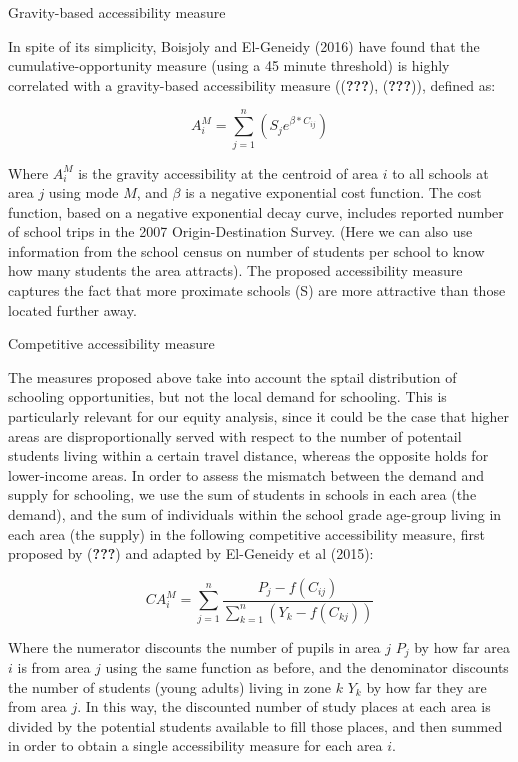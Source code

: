 \documentclass[]{article}
\begin{document}
Gravity-based accessibility measure

In spite of its simplicity, Boisjoly and El-Geneidy (2016) have found
that the cumulative-opportunity measure (using a 45 minute threshold) is
highly correlated with a gravity-based accessibility measure
(({\textbf{???}}), ({\textbf{???}})), defined as:

\[ A_{i}^M= \sum_{j=1}^n(S_{j}e^{\beta*C_{ij}}) \]

Where \(A_{i}^M\) is the gravity accessibility at the centroid of area
\(i\) to all schools at area \(j\) using mode \(M\), and \(\beta\) is a
negative exponential cost function. The cost function, based on a
negative exponential decay curve, includes reported number of school
trips in the 2007 Origin-Destination Survey. (Here we can also use
information from the school census on number of students per school to
know how many students the area attracts). The proposed accessibility
measure captures the fact that more proximate schools (S) are more
attractive than those located further away.

Competitive accessibility measure

The measures proposed above take into account the sptail distribution of
schooling opportunities, but not the local demand for schooling. This is
particularly relevant for our equity analysis, since it could be the
case that higher areas are disproportionally served with respect to the
number of potentail students living within a certain travel distance,
whereas the opposite holds for lower-income areas. In order to assess
the mismatch between the demand and supply for schooling, we use the sum
of students in schools in each area (the demand), and the sum of
individuals within the school grade age-group living in each area (the
supply) in the following competitive accessibility measure, first
proposed by ({\textbf{???}}) and adapted by El-Geneidy et al (2015):

\[ CA_{i}^M= \sum_{j=1}^n\frac{P_{j}-f(C_{ij})}{\sum_{k=1}^n(Y_{k}-f(C_{kj}))}\]

Where the numerator discounts the number of pupils in area \(j\)
\(P_{j}\) by how far area \(i\) is from area \(j\) using the same
function as before, and the denominator discounts the number of students
(young adults) living in zone \(k\) \(Y_{k}\) by how far they are from
area \(j\). In this way, the discounted number of study places at each
area is divided by the potential students available to fill those
places, and then summed in order to obtain a single accessibility
measure for each area \(i\).
\end{document}
